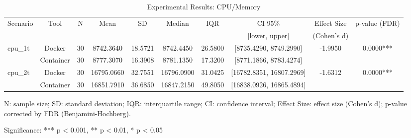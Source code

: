 \documentclass{article}
\begin{document}

\begin{table}[h]
\centering
\small
\caption{Experimental Results: CPU/Memory}
\label{tab:cpu_memory}
\begin{tabular}{lccccccccc}
\toprule
Scenario & Tool & N & Mean & SD & Median & IQR & CI 95\% & Effect Size & p-value (FDR) \\
 & & & & & & & [lower, upper] & (Cohen's d) & \\
\midrule
\multirow{2}{*}{cpu\_1t} & Docker & 30 & 8742.3640 & 18.5721 & 8742.4450 & 26.5800 & [8735.4290, 8749.2990] & -1.9950 & 0.0000*** \\
 & Container & 30 & 8777.3070 & 16.3908 & 8781.1350 & 17.3200 & [8771.1866, 8783.4274] &  &  \\
\midrule
\multirow{2}{*}{cpu\_2t} & Docker & 30 & 16795.0660 & 32.7551 & 16796.0900 & 31.0425 & [16782.8351, 16807.2969] & -1.6312 & 0.0000*** \\
 & Container & 30 & 16851.7910 & 36.6850 & 16847.2150 & 49.8050 & [16838.0926, 16865.4894] &  &  \\
\midrule
\bottomrule
\end{tabular}
\begin{tablenotes}
\small
\item N: sample size; SD: standard deviation; IQR: interquartile range; CI: confidence interval; Effect Size: effect size (Cohen's d); p-value corrected by FDR (Benjamini-Hochberg).
\item Significance: *** p < 0.001, ** p < 0.01, * p < 0.05
\end{tablenotes}
\end{table}
\end{document}
